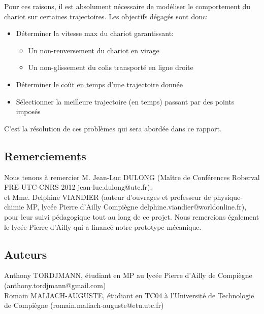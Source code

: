 Pour ces raisons, il est absolument nécessaire de modéliser le comportement du chariot sur certaines trajectoires. Les objectifs dégagés sont donc:
\begin{itemize}
	\item Déterminer la vitesse max du chariot garantissant:
		\begin{itemize}
			\item Un non-renversement du chariot en virage
			\item Un non-glissement du colis transporté en ligne droite
		\end{itemize}
	\item Déterminer le coût en temps d'une trajectoire donnée
	\item Sélectionner la meilleure trajectoire (en temps) passant par des points imposés
\end{itemize}

C'est la résolution de ces problèmes qui sera abordée dans ce rapport.


\subsection{Remerciements}
Nous tenons à remercier M. Jean-Luc DULONG (Maître de Conférences Roberval FRE UTC-CNRS 2012 jean-luc.dulong@utc.fr);\\
et Mme. Delphine VIANDIER (auteur d'ouvrages et professeur de physique-chimie MP, lycée Pierre d'Ailly Compiègne delphine.viandier@worldonline.fr),\\
pour leur suivi pédagogique tout au long de ce projet.
Nous remercions également le lycée Pierre d'Ailly qui a financé notre prototype mécanique.\\
\subsection{Auteurs}
Anthony TORDJMANN, étudiant en MP au lycée Pierre d'Ailly de Compiègne (anthony.tordjmann@gmail.com)\\
Romain MALIACH-AUGUSTE, étudiant en TC04 à l'Université de Technologie de Compiègne (romain.maliach-auguste@etu.utc.fr)
